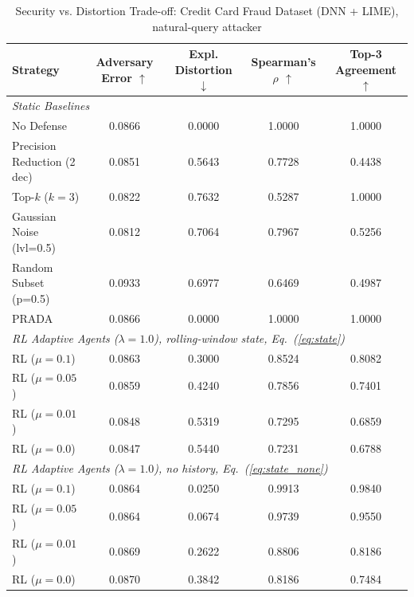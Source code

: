 \documentclass[conference]{IEEEtran}
\DeclareRobustCommand{\rev}[1]{#1}
\DeclareRobustCommand{\revnew}[1]{#1}
\begin{document}
\begin{table}[t]
\caption{Security vs. Distortion Trade-off: Credit Card Fraud Dataset (DNN + LIME)\rev{, natural-query attacker}}
\begin{center}
{\footnotesize
\begin{tabular}{lcccc}
\toprule
\textbf{Strategy} & \textbf{\rev{Adversary Error} $\uparrow$} & \textbf{\rev{Expl. Distortion} $\downarrow$} & \textbf{Spearman's $\rho$ $\uparrow$} & \textbf{Top-3 Agreement $\uparrow$} \\
\midrule
\multicolumn{5}{l}{\textit{Static Baselines}} \\
\rev{No Defense} & \rev{0.0866} & \rev{0.0000} & \rev{1.0000} & \rev{1.0000} \\
\rev{Precision Reduction (2 dec)} & \rev{0.0851} & \rev{0.5643} & \rev{0.7728} & \rev{0.4438} \\
\rev{Top-$k$ ($k=3$)} & \rev{0.0822} & \rev{0.7632} & \rev{0.5287} & \rev{1.0000} \\
\rev{Gaussian Noise (lvl=0.5)} & \rev{0.0812} & \rev{0.7064} & \rev{0.7967} & \rev{0.5256} \\
\rev{Random Subset (p=0.5)} & \rev{0.0933} & \rev{0.6977} & \rev{0.6469} & \rev{0.4987} \\
\rev{PRADA \cite{b17}} & \rev{0.0866} & \rev{0.0000} & \rev{1.0000} & \rev{1.0000} \\
\midrule
\multicolumn{5}{l}{\textit{RL Adaptive Agents ($\lambda=1.0$)\rev{, rolling-window state\revnew{, Eq.~(\ref{eq:state})}}}} \\
\rev{RL ($\mu = 0.1$)} & \rev{0.0863} & \rev{0.3000} & \rev{0.8524} & \rev{0.8082} \\
\rev{RL ($\mu = 0.05$)} & \rev{0.0859} & \rev{0.4240} & \rev{0.7856} & \rev{0.7401} \\
\rev{RL ($\mu = 0.01$)} & \rev{0.0848} & \rev{0.5319} & \rev{0.7295} & \rev{0.6859} \\
\rev{RL ($\mu = 0.0$)} & \rev{0.0847} & \rev{0.5440} & \rev{0.7231} & \rev{0.6788} \\
\midrule
\multicolumn{5}{l}{\rev{\textit{RL Adaptive Agents ($\lambda=1.0$), no history\revnew{, Eq.~(\ref{eq:state_none})}}}} \\
\rev{RL ($\mu = 0.1$)} & \rev{0.0864} & \rev{0.0250} & \rev{0.9913} & \rev{0.9840} \\
\rev{RL ($\mu = 0.05$)} & \rev{0.0864} & \rev{0.0674} & \rev{0.9739} & \rev{0.9550} \\
\rev{RL ($\mu = 0.01$)} & \rev{0.0869} & \rev{0.2622} & \rev{0.8806} & \rev{0.8186} \\
\rev{RL ($\mu = 0.0$)} & \rev{0.0870} & \rev{0.3842} & \rev{0.8186} & \rev{0.7484} \\
\bottomrule
\end{tabular}
}
\label{tab_credit}
\end{center}
\end{table}
\end{document}
